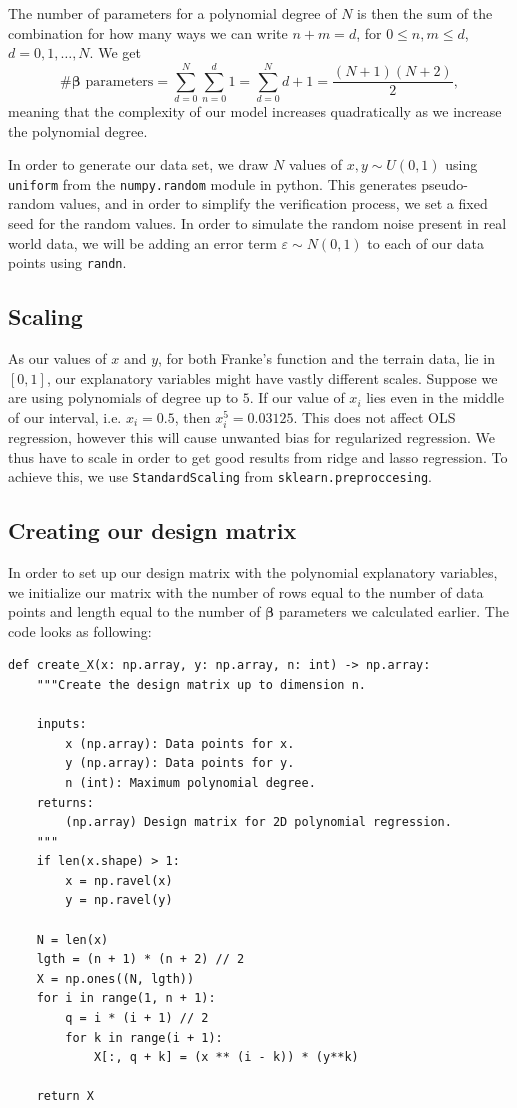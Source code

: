 \documentclass{article}
\begin{document}
The number of parameters for a polynomial degree of $N$ is then the sum of the combination for how many ways we can write $n+m = d$, for $0\leq n,m \leq d$, $d = 0, 1, \ldots, N$. We get
\begin{equation*}
    \text{\# $\boldsymbol{\beta}$ parameters} = \sum_{d = 0}^N \sum_{n = 0}^d 1
    = \sum_{d = 0}^N d + 1
    = \frac{(N + 1)(N + 2)}{2},
\end{equation*}
meaning that the complexity of our model increases quadratically as we increase the polynomial degree.

In order to generate our data set, we draw $N$ values of $x,y \sim U(0, 1)$ using \verb|uniform| from the \verb|numpy.random| module in python. This generates pseudo-random values, and in order to simplify the verification process, we set a fixed seed for the random values. In order to simulate the random noise present in real world data, we will be adding an error term $\varepsilon \sim N(0,1)$ to each of our data points using \verb|randn|.

\subsection{Scaling}

As our values of $x$ and $y$, for both Franke's function and the terrain data,  lie in $[0, 1]$, our explanatory variables might have vastly different scales. Suppose we are using polynomials of degree up to $5$. If our value of $x_i$ lies even in the middle of our interval, i.e. $x_i = 0.5$, then $x_i^5 = 0.03125$. This does not affect OLS regression, however this will cause unwanted bias for regularized regression. We thus have to scale in order to get good results from ridge and lasso regression. To achieve this, we use \verb|StandardScaling| from \verb|sklearn.preproccesing|.

\subsection{Creating our design matrix}
In order to set up our design matrix with the polynomial explanatory variables, we initialize our matrix with the number of rows equal to the number of data points and length equal to the number of $\boldsymbol{\beta}$ parameters we calculated earlier. The code looks as following:
\begin{verbatim}
def create_X(x: np.array, y: np.array, n: int) -> np.array:
    """Create the design matrix up to dimension n.

    inputs:
        x (np.array): Data points for x.
        y (np.array): Data points for y.
        n (int): Maximum polynomial degree.
    returns:
        (np.array) Design matrix for 2D polynomial regression.
    """
    if len(x.shape) > 1:
        x = np.ravel(x)
        y = np.ravel(y)

    N = len(x)
    lgth = (n + 1) * (n + 2) // 2
    X = np.ones((N, lgth))
    for i in range(1, n + 1):
        q = i * (i + 1) // 2
        for k in range(i + 1):
            X[:, q + k] = (x ** (i - k)) * (y**k)

    return X
\end{verbatim}
\end{document}
